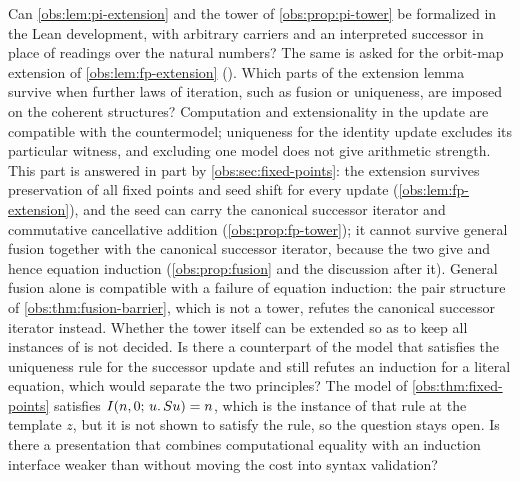 \begin{question}
Can \cref{obs:lem:pi-extension} and the tower of \cref{obs:prop:pi-tower} be
formalized in the Lean development, with arbitrary carriers and an interpreted
successor in place of readings over the natural numbers? The same is asked for
the orbit-map extension of \cref{obs:lem:fp-extension}
(). Which parts of the
extension lemma survive when further laws of iteration, such as fusion or
uniqueness, are imposed on the coherent structures? Computation and
extensionality in the update are compatible with the countermodel; uniqueness
for the identity update excludes its particular witness, and excluding one
model does not give arithmetic strength. This part is answered in part by
\cref{obs:sec:fixed-points}: the extension survives preservation of all fixed
points and seed shift for every update (\cref{obs:lem:fp-extension}), and the
seed can carry the canonical successor iterator and commutative cancellative
addition (\cref{obs:prop:fp-tower}); it cannot survive general fusion together
with the canonical successor iterator, because the two give  and
hence equation induction (\cref{obs:prop:fusion} and the discussion after it).
General fusion alone is compatible with a failure of equation induction: the
pair structure of \cref{obs:thm:fusion-barrier}, which is not a tower, refutes
the canonical successor iterator instead. Whether the tower itself can be
extended so as to keep all instances of  is not decided. Is
there a counterpart of the model
that satisfies the uniqueness rule for the successor update and still refutes
an induction for a literal equation, which would separate the two principles?
The model of \cref{obs:thm:fixed-points} satisfies $I(n,0;\,u.\,S u)=n$,
which is the instance of that rule at the template $z$, but it is not shown to
satisfy the rule, so the question stays open.
Is there a presentation that combines computational equality with an induction
interface weaker than  without moving the cost into syntax
validation?
\end{question}

